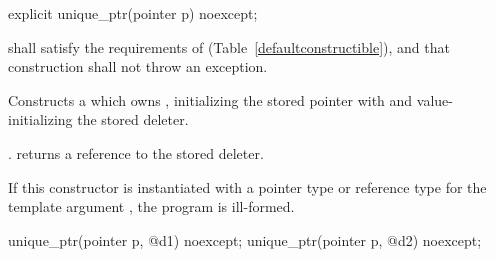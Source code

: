 \begin{itemdecl}
explicit unique_ptr(pointer p) noexcept;
\end{itemdecl}

\begin{itemdescr}
\pnum
\requires {} shall
satisfy the requirements of  (Table~\ref{defaultconstructible}),
and that construction shall not throw an exception.

\pnum
\effects Constructs a  which owns
, initializing the stored pointer with  and
value-initializing the stored deleter.

\pnum
\postconditions {}. 
returns a reference to the stored deleter.

\pnum
\notes If this constructor is instantiated with a pointer type or reference type
for the template argument , the program is ill-formed.
\end{itemdescr}

\begin{itemdecl}
unique_ptr(pointer p, @\seebelow@ d1) noexcept;
unique_ptr(pointer p, @\seebelow@ d2) noexcept;
\end{itemdecl}

